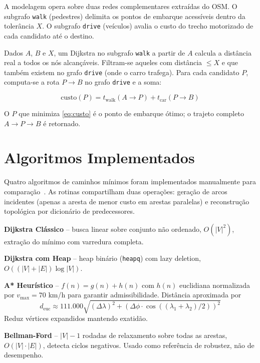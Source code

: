 \documentclass[conference]{IEEEtran}
\begin{document}
A modelagem opera sobre duas redes complementares extraídas do OSM. O subgrafo \texttt{walk} (pedestres) delimita os pontos de embarque acessíveis dentro da tolerância $X$. O subgrafo \texttt{drive} (veículos) avalia o custo do trecho motorizado de cada candidato até o destino.

Dados $A$, $B$ e $X$, um Dijkstra no subgrafo \texttt{walk} a partir de $A$ calcula a distância real a todos os nós alcançáveis. Filtram-se aqueles com distância $\le X$ e que também existem no grafo \texttt{drive} (onde o carro trafega). Para cada candidato $P$, computa-se a rota $P \to B$ no grafo \texttt{drive} e a soma:

\begin{equation}
\text{custo}(P) = t_{\text{walk}}(A \to P) + t_{\text{car}}(P \to B)
\label{eq:custo}
\end{equation}

O $P$ que minimiza \eqref{eq:custo} é o ponto de embarque ótimo; o trajeto completo $A \to P \to B$ é retornado.

\section{Algoritmos Implementados}

Quatro algoritmos de caminhos mínimos foram implementados manualmente para comparação~\cite{cormen}. As rotinas compartilham duas operações: geração de arcos incidentes (apenas a aresta de menor custo em arestas paralelas) e reconstrução topológica por dicionário de predecessores.

\textbf{Dijkstra Clássico} -- busca linear sobre conjunto não ordenado, $O(|V|^2)$, extração do mínimo com varredura completa.

\textbf{Dijkstra com Heap} -- heap binário (\texttt{heapq}) com lazy deletion, $O((|V|+|E|)\log|V|)$.

\textbf{A* Heurístico} -- $f(n)=g(n)+h(n)$ com $h(n)$ euclidiana normalizada por $v_{\max}=70$ km/h para garantir admissibilidade. Distância aproximada por
\begin{equation}
d_{\text{euc}} \approx 111.000 \sqrt{(\Delta\lambda)^2 + (\Delta\phi\cdot\cos((\lambda_1+\lambda_2)/2))^2}
\label{eq:euclidiana}
\end{equation}
Reduz vértices expandidos mantendo exatidão.

\textbf{Bellman-Ford} -- $|V|-1$ rodadas de relaxamento sobre todas as arestas, $O(|V|\cdot|E|)$, detecta ciclos negativos. Usado como referência de robustez, não de desempenho.
\end{document}

